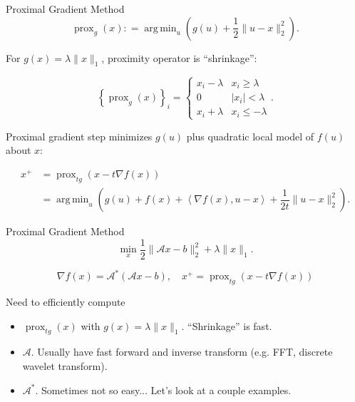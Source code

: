 \documentclass[xcolor=dvipsnames,t]{beamer} %
\newcommand{\defeq}{\mathrel{\mathop:}=}
\DeclareMathOperator*{\argmin}{arg\,min}
\begin{document}
\begin{frame}{Proximal Gradient Method}
   \[ \operatorname{prox}_g(x) \defeq \argmin_u\left(g(u) + \dfrac{1}{2}\|u-x\|_2^2\right). \] 

   For $g(x) = \lambda\|x\|_1$, proximity operator is ``shrinkage'':

   \[ \left\{\operatorname{prox}_g(x)\right\}_i = \left\{\begin{array}{ll} x_i-\lambda & x_i \ge \lambda\\0 & |x_i| < \lambda\\ x_i + \lambda & x_i\le -\lambda\end{array}\right.. \] 

   Proximal gradient step minimizes $g(u)$ plus quadratic local model of $f(u)$ about $x$:

   \begin{align*}
      x^+ &= \operatorname{prox}_{t g}\left(x - t\nabla f(x)\right)\\
              &= \argmin_u\left(g(u) + f(x) + \left\langle \nabla f(x), u-x\right\rangle + \dfrac{1}{2t}\|u-x\|_2^2\right).
   \end{align*}

\end{frame}

\begin{frame}{Proximal Gradient Method}
   \[ \min_x \dfrac{1}{2}\|\mathcal{A}x-b\|_2^2 + \lambda \|x\|_1. \] 

   \[ \nabla f(x) = \mathcal{A}^\ast\left(\mathcal{A}x-b\right), \quad x^{+} = \operatorname{prox}_{t g}\left(x - t\nabla f(x)\right)\] 

   \noindent Need to efficiently compute
   \begin{itemize}
      \item $\operatorname{prox}_{tg}(x)$ with $g(x) = \lambda \|x\|_1$.  ``Shrinkage'' is fast.
      \item $\mathcal{A}$.  Usually have fast forward and inverse transform (e.g. FFT, discrete wavelet transform).
      \item $\mathcal{A}^\ast$.  Sometimes not so easy...  Let's look at a couple examples.
   \end{itemize}
\end{frame}
\end{document}
